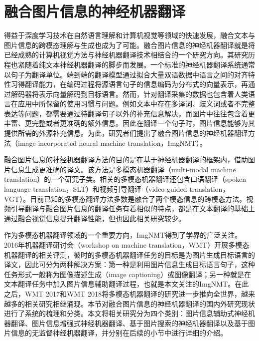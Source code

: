 \section{融合图片信息的神经机器翻译}
\label{sec:2_imgnmt}

得益于深度学习技术在自然语言理解和计算机视觉等领域的快速发展，融合文本与图片信息的跨模态理解与生成也成为了可能。融合图片信息的神经机器翻译就是将已经成熟的计算机视觉方法与神经机器翻译技术相结合的一个研究方向。其研究历程也紧随着纯文本神经机器翻译的脚步而发展。一个标准的神经机器翻译系统通常以句子为翻译单位。端到端的翻译模型通过拟合大量双语数据中语言之间的对齐特性习得翻译能力，在编码过程将源语言句子的信息编码为分布式的向量表示，再通过解码器将表示向量解码到目标语言。然而，针对翻译采集的数据也包含着人类语言在应用中所保留的使用习惯与问题。例如文本中存在多译词、歧义词或者不完整表达等问题，都需要通过待翻译句子以外的补充信息解决，而图片中往往包含着更丰富、更完整或者更准确的额外信息。因此在翻译一个句子时，图片信息能够为其提供所需的外源补充信息。为此，研究者们提出了融合图片信息的神经机器翻译方法（image-incorporated neural machine translation，ImgNMT）。

融合图片信息的神经机器翻译方法的目的是在基于神经机器翻译的框架内，借助图片信息生成更准确的译文。该方法是多模态机器翻译（multi-modal machine translation）的一个研究子类。相关的多模态机器翻译还包含口语翻译（spoken language translation，SLT）和视频引导翻译（video-guided translation，VGT）。目前已知的多模态翻译方法多数是融合了两个模态信息的跨模态方法。视频引导翻译与融合图片信息的翻译任务有着相似的特点，都是在文本翻译的基础上通过融合视觉信息提升翻译性能，但也因此相关研究较少。

作为多模态机器翻译领域的一个重要方向，ImgNMT得到了学界的广泛关注。2016年机器翻译研讨会（workshop on machine translation，WMT）开展多模态机器翻译的相关评测，彼时的多模态机器翻译任务的目标是为图片生成目标语言的译文，因此可分为两种解决方案：第一种是利用图片信息生成目标语言句子，这种任务形式一般称为图像描述生成（image captioning）或图像翻译；另一种就是在文本翻译任务中加入图片信息辅助翻译过程，也就是本文关注的ImgNMT。在此之后，WMT 2017和WMT 2018将多模态机器翻译的研究进一步推向全世界，越来越多的相关研究相继涌现。本节对融合图片信息的神经机器翻译的国内外研究现状进行了系统的梳理和分类。本文将相关研究分为四个类别：图片信息辅助式神经机器翻译、图片信息增强式神经机器翻译、基于图片搜索的神经机器翻译以及基于图片信息的无监督神经机器翻译，并分别在后续的小节中进行详细的介绍。

